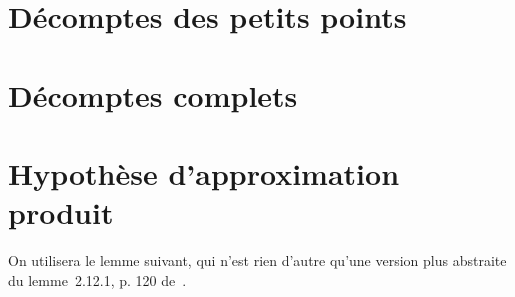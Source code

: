 
\section{Décomptes des petits points}
\label{sec:small-points}



\section{Décomptes complets}
\label{sec:all-points}



\section{Hypothèse d'approximation produit}
\label{sec:ha-prod}

On utilisera le lemme suivant, qui n'est rien d'autre qu'une version plus
abstraite du lemme~2.12.1, p. 120 de~\cite{farhith}.


\cleardoublepage
\endinput

